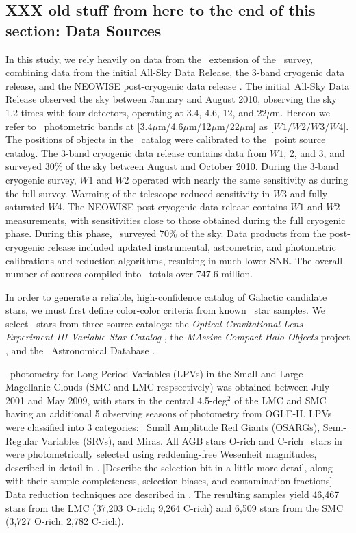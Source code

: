 \subsection{XXX old stuff from here to the end of this section: Data Sources}
\label{sec:sources}
In this study, we rely heavily on data from the \allwise\, extension of the \wise\, survey, combining data from the initial All-Sky Data Release, the 3-band cryogenic data release, and the NEOWISE post-cryogenic data release \citep{2013wise.rept....1C}. The initial \wise\,All-Sky Data Release observed the sky between January and August 2010, observing the sky 1.2 times with four detectors, operating at 3.4, 4.6, 12, and 22$\mu$m. Hereon we refer to \allwise\, photometric bands at [3.4$\mu$m/4.6$\mu$m/12$\mu$m/22$\mu$m] as [$W1/W2/W3/W4$]. The positions of objects in the \wise\, catalog were calibrated to the \twomass\, point source catalog. The 3-band cryogenic data release contains data from $W1$, 2, and 3, and surveyed $30\%$ of the sky between August and October 2010. During the 3-band cryogenic survey, $W1$ and $W2$ operated with nearly the same sensitivity as during the full survey. Warming of the telescope reduced sensitivity in $W3$ and fully saturated $W4$. The NEOWISE post-cryogenic data release contains $W1$ and $W2$ measurements, with sensitivities close to those obtained during the full cryogenic phase. During this phase, \wise\, surveyed $70\%$ of the sky. Data products from the post-cryogenic release included updated instrumental, astrometric, and photometric calibrations and reduction algorithms, resulting in much lower SNR. The overall number of sources compiled into \allwise\, totals over 747.6 million.

In order to generate a reliable, high-confidence catalog of Galactic candidate \agb\, stars, we must first define color-color criteria from known \agb\, star samples. We select \agb\, stars from three source catalogs: the {\it Optical Gravitational Lens Experiment-III Variable Star Catalog} \citep[\ogle,][]{2008AcA....58...69U,2009AcA....59..239S,2011AcA....61..217S}, the {\it MAssive Compact Halo Objects} project \citep[\macho,][]{1997ApJ...482...89A}, and the \simbad\, Astronomical Database \citep{2000A&AS..143....9W}. 

\ogle\, photometry for Long-Period Variables (LPVs) in the Small and Large Magellanic Clouds (SMC and LMC respsectively) was obtained between July 2001 and May 2009, with stars in the central 4.5-deg$^2$ of the LMC and SMC having an additional 5 observing seasons of photometry from OGLE-II. LPVs were classified into 3 categories: \ogle\, Small Amplitude Red Giants (OSARGs), Semi-Regular Variables (SRVs), and Miras. All AGB stars  O-rich and C-rich \agb\, stars in \ogle\, were photometrically selected using reddening-free Wesenheit magnitudes, described in detail in \cite{2009AcA....59..239S,2011AcA....61..217S}. {\color{red}[Describe the selection bit in a little more detail, along with their sample completeness, selection biases, and contamination fractions]} Data reduction techniques are described in \cite{2008AcA....58...69U}. The resulting samples yield 46,467 \agb\, stars from the LMC (37,203 O-rich; 9,264 C-rich) and 6,509 stars from the SMC (3,727 O-rich; 2,782 C-rich). 

